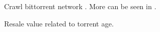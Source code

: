 

Crawl bittorrent network \cite{2011:yoshida:crawlbtnet}. More can be seen in \cite{2010:btworld:wojciechowski}.

Resale value \cite{2012:economicbt:kash} related to torrent age. 

